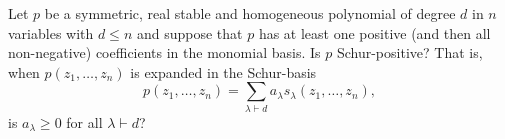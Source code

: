 Let $p$ be a symmetric, real stable and homogeneous polynomial of degree $d$ in $n$ variables with $d\le n$ and suppose that $p$ has at least one positive (and then all non-negative) coefficients in the monomial basis.  Is $p$ Schur-positive?  That is, when $p(z_1,\ldots,z_n)$ is expanded in the Schur-basis
\[p(z_1,\ldots,z_n)=\sum_{\lambda\vdash d}a_\lambda s_\lambda(z_1,\ldots,z_n),\]
is $a_\lambda\ge0$ for all $\lambda\vdash d$?
